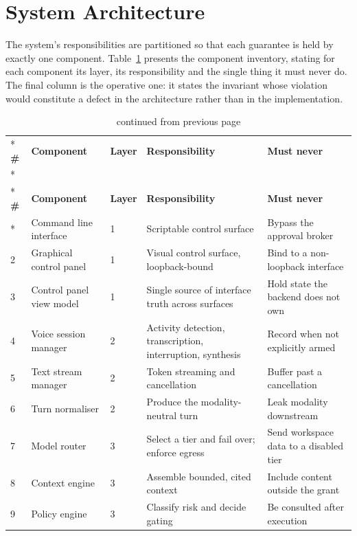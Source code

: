 \documentclass{FastFyp}
\begin{document}
\section{System Architecture}
The system's responsibilities are partitioned so that each guarantee is held by exactly one component. Table~\ref{tab:components} presents the component inventory, stating for each component its layer, its responsibility and the single thing it must never do. The final column is the operative one: it states the invariant whose violation would constitute a defect in the architecture rather than in the implementation.

{\small
{}
\begin{longtable}{|p{0.6cm}|p{2.8cm}|p{0.9cm}|p{4.0cm}|p{4.2cm}|}
\caption{Component inventory.}\label{tab:components}\\*
\hline
\textbf{\#} & \textbf{Component} & \textbf{Layer} & \textbf{Responsibility} & \textbf{Must never} \\*
\hline
\endfirsthead
\caption[]{continued from previous page}\\*
\hline
\textbf{\#} & \textbf{Component} & \textbf{Layer} & \textbf{Responsibility} & \textbf{Must never} \\*
\hline
\endhead
\hline
1 & Command line interface & 1 & Scriptable control surface & Bypass the approval broker \\
\hline
2 & Graphical control panel & 1 & Visual control surface, loopback-bound & Bind to a non-loopback interface \\
\hline
3 & Control panel view model & 1 & Single source of interface truth across surfaces & Hold state the backend does not own \\
\hline
4 & Voice session manager & 2 & Activity detection, transcription, interruption, synthesis & Record when not explicitly armed \\
\hline
5 & Text stream manager & 2 & Token streaming and cancellation & Buffer past a cancellation \\
\hline
6 & Turn normaliser & 2 & Produce the modality-neutral turn & Leak modality downstream \\
\hline
7 & Model router & 3 & Select a tier and fail over; enforce egress & Send workspace data to a disabled tier \\
\hline
8 & Context engine & 3 & Assemble bounded, cited context & Include content outside the grant \\
\hline
9 & Policy engine & 3 & Classify risk and decide gating & Be consulted after execution \\

\end{longtable}}
\end{document}
